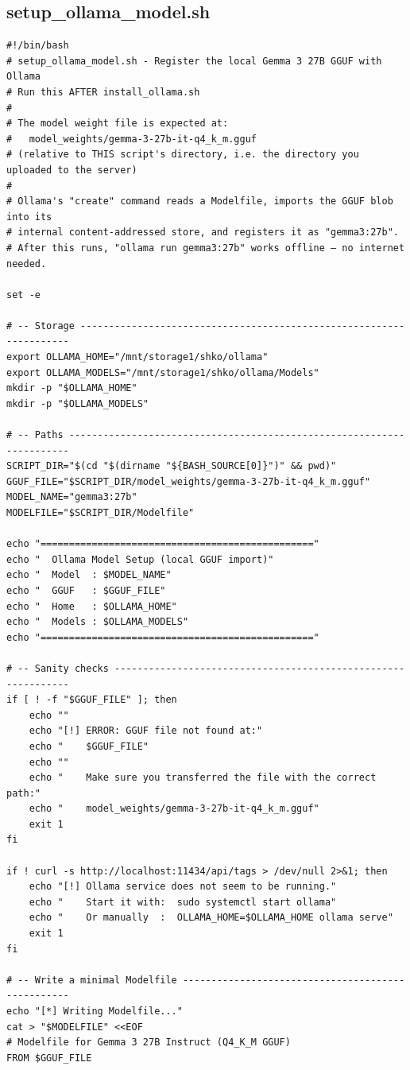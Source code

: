 \documentclass[11pt]{article}
\begin{document}
\subsection{setup\_ollama\_model.sh}
\begin{lstlisting}[style=bashstyle, caption={setup\_ollama\_model.sh}]
#!/bin/bash
# setup_ollama_model.sh - Register the local Gemma 3 27B GGUF with Ollama
# Run this AFTER install_ollama.sh
#
# The model weight file is expected at:
#   model_weights/gemma-3-27b-it-q4_k_m.gguf
# (relative to THIS script's directory, i.e. the directory you uploaded to the server)
#
# Ollama's "create" command reads a Modelfile, imports the GGUF blob into its
# internal content-addressed store, and registers it as "gemma3:27b".
# After this runs, "ollama run gemma3:27b" works offline — no internet needed.

set -e

# -- Storage --------------------------------------------------------------------
export OLLAMA_HOME="/mnt/storage1/shko/ollama"
export OLLAMA_MODELS="/mnt/storage1/shko/ollama/Models"
mkdir -p "$OLLAMA_HOME"
mkdir -p "$OLLAMA_MODELS"

# -- Paths ----------------------------------------------------------------------
SCRIPT_DIR="$(cd "$(dirname "${BASH_SOURCE[0]}")" && pwd)"
GGUF_FILE="$SCRIPT_DIR/model_weights/gemma-3-27b-it-q4_k_m.gguf"
MODEL_NAME="gemma3:27b"
MODELFILE="$SCRIPT_DIR/Modelfile"

echo "================================================"
echo "  Ollama Model Setup (local GGUF import)"
echo "  Model  : $MODEL_NAME"
echo "  GGUF   : $GGUF_FILE"
echo "  Home   : $OLLAMA_HOME"
echo "  Models : $OLLAMA_MODELS"
echo "================================================"

# -- Sanity checks --------------------------------------------------------------
if [ ! -f "$GGUF_FILE" ]; then
    echo ""
    echo "[!] ERROR: GGUF file not found at:"
    echo "    $GGUF_FILE"
    echo ""
    echo "    Make sure you transferred the file with the correct path:"
    echo "    model_weights/gemma-3-27b-it-q4_k_m.gguf"
    exit 1
fi

if ! curl -s http://localhost:11434/api/tags > /dev/null 2>&1; then
    echo "[!] Ollama service does not seem to be running."
    echo "    Start it with:  sudo systemctl start ollama"
    echo "    Or manually  :  OLLAMA_HOME=$OLLAMA_HOME ollama serve"
    exit 1
fi

# -- Write a minimal Modelfile --------------------------------------------------
echo "[*] Writing Modelfile..."
cat > "$MODELFILE" <<EOF
# Modelfile for Gemma 3 27B Instruct (Q4_K_M GGUF)
FROM $GGUF_FILE


\end{lstlisting}
\end{document}
